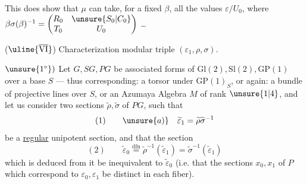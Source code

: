 This does show that $\mu$ can  take, for a fixed $\beta$, all the values $\varepsilon/U_0$, where $\beta\sigma(\beta)^{-1}=\begin{pmatrix}R_0&\unsure{S_0|C_0}\\T_0&U_0\end{pmatrix}$ \ldots
{}

($\uline{\overline{\mathrm{VI}}}$) Characterization  modular triple $(\varepsilon_1,\rho,\sigma)$.

$\unsure{1^\circ})$ Let $G,SG,PG$ be associated forms of $\mathrm{Gl}(2),\mathrm{Sl}(2),\mathrm{GP}(1)$ over a base $S$ --- thus corresponding: a torsor under $\mathrm{GP}(1)_S$, or again: a bundle of projective lines  over $S$, or an Azumaya Algebra $M$ of rank $\unsure{1|4}$, and let us consider two sections  $\widetilde\rho,\widetilde\sigma$ of $PG$, such that
\[
(1)\qquad \unsure{a)}\quad\widetilde\varepsilon_1=\widetilde\rho\widetilde\sigma^{-1}
\]
be  a \uline{regular} unipotent section, and that the section
\[
(2)\qquad \widetilde\varepsilon_0\overset{\mathrm{dfn}}=\widetilde\rho^{-1}(\widetilde\varepsilon_1)=\widetilde\sigma^{-1}(\widetilde\varepsilon_1)
\]
which is deduced from it be   inequivalent to $\widetilde\varepsilon_0$ (i.e. that the sections $x_0,x_1$ of $P$ which correspond to $\varepsilon_0,\varepsilon_1$ be  distinct in each fiber).


